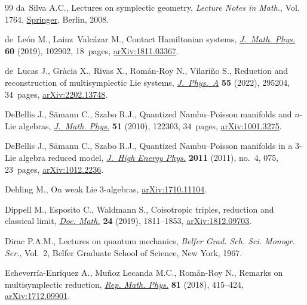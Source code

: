 \documentclass[10pt,a4paper]{amsart}
\numberwithin{equation}{section}
\begin{document}
\begin{thebibliography}{99}
da~Silva A.C., Lectures on symplectic geometry, \textit{Lecture Notes in
  Math.}, Vol. 1764, \href{https://doi.org/10.1007/978-3-540-45330-7}{Springer}, Berlin, 2008.

de~Le\'on M., Lainz~Valc\'azar M., Contact {H}amiltonian systems,
  \href{https://doi.org/10.1063/1.5096475}{\textit{J.~Math. Phys.}} \textbf{60} (2019), 102902, 18~pages,
  \href{https://arxiv.org/abs/1811.03367}{arXiv:1811.03367}.

de~Lucas J., Gr\`acia X., Rivas X., Rom\'an-Roy N., Vilari\~no S., Reduction
  and reconstruction of multisymplectic {L}ie systems, \href{https://doi.org/10.1088/1751-8121/ac78ab}{\textit{J.~Phys.~A}}
  \textbf{55} (2022), 295204, 34~pages, \href{https://arxiv.org/abs/2202.13748}{arXiv:2202.13748}.

DeBellis J., S\"amann C., Szabo R.J., Quantized {N}ambu--{P}oisson manifolds
  and {$n$}-{L}ie algebras, \href{https://doi.org/10.1063/1.3503773}{\textit{J.~Math. Phys.}} \textbf{51} (2010), 122303,
  34~pages, \href{https://arxiv.org/abs/1001.3275}{arXiv:1001.3275}.

DeBellis J., S\"amann C., Szabo R.J., Quantized {N}ambu--{P}oisson manifolds in
  a 3-{L}ie algebra reduced model, \href{https://doi.org/10.1007/JHEP04(2011)075}{\textit{J.~High Energy Phys.}} \textbf{2011}
  (2011), no.~4, 075, 23~pages, \href{https://arxiv.org/abs/1012.2236}{arXiv:1012.2236}.

Dehling M., On weak Lie 3-algebras, \href{https://arxiv.org/abs/1710.11104}{arXiv:1710.11104}.

Dippell M., Esposito C., Waldmann S., Coisotropic triples, reduction and
  classical limit, \href{https://doi.org/10.4171/DM/716}{\textit{Doc. Math.}} \textbf{24} (2019), 1811--1853,
  \href{https://arxiv.org/abs/1812.09703}{arXiv:1812.09703}.

Dirac P.A.M., Lectures on quantum mechanics, \textit{Belfer Grad. Sch. Sci.
  Monogr. Ser.}, Vol.~2, Belfer Graduate School of Science, New York, 1967.

Echeverr\'ia-Enr\'iquez A., Mu\~noz Lecanda M.C., Rom\'an-Roy N., Remarks on
  multisymplectic reduction, \href{https://doi.org/10.1016/S0034-4877(18)30057-0}{\textit{Rep. Math. Phys.}} \textbf{81} (2018),
  415--424, \href{https://arxiv.org/abs/1712.09901}{arXiv:1712.09901}.


\end{thebibliography}
\end{document}
